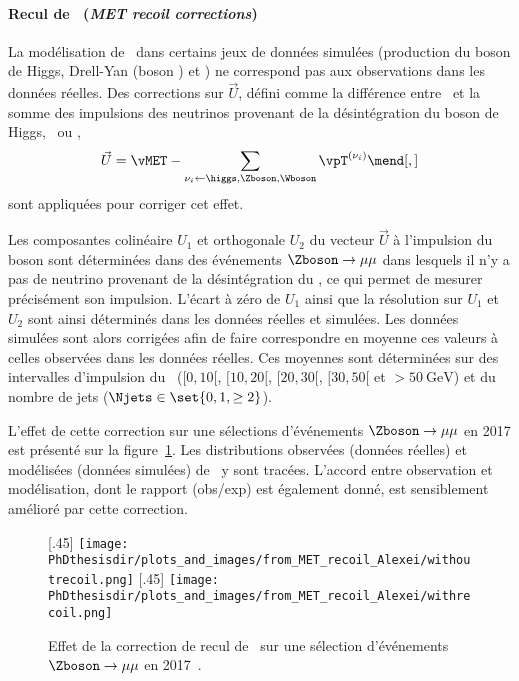 \paragraph{Recul de \MET\ (\emph{MET recoil corrections})}
La modélisation de \MET\ dans certains jeux de données simulées (production du boson de Higgs, Drell-Yan (boson \Zboson) et \Wjets) ne correspond pas aux observations dans les données réelles.
Des corrections sur $\vec{U}$, défini comme la différence entre \MET\ et la somme des impulsions des neutrinos provenant de la désintégration du boson de Higgs, \Zboson\ ou \Wboson, \ie
\begin{equation}
\vec{U} = \vMET - \sum_{\nu_i \leftarrow \higgs,\Zboson,\Wboson} \vpT^{(\nu_i)}
\mend[,]
\end{equation}
sont appliquées pour corriger cet effet.
\par
Les composantes colinéaire $U_1$ et orthogonale $U_2$ du vecteur $\vec{U}$ à l'impulsion du boson sont déterminées dans des événements $\Zboson\to\mu\mu$ dans lesquels il n'y a pas de neutrino provenant de la désintégration du \Zboson, ce qui permet de mesurer précisément son impulsion.
L'écart à zéro de $U_1$ ainsi que la résolution sur $U_1$ et $U_2$ sont ainsi déterminés dans les données réelles et simulées.
Les données simulées sont alors corrigées afin de faire correspondre en moyenne ces valeurs à celles observées dans les données réelles.
Ces moyennes sont déterminées sur des intervalles d'impulsion du \Zboson\ ($[\num{0}, \num{10}[$, $[\num{10}, \num{20}[$, $[\num{20}, \num{30}[$, $[\num{30}, \num{50}[$ et $>\SI{50}{\GeV}$) et du nombre de jets ($\Njets\in\set{0, 1, \geq2}$).
\par
L'effet de cette correction sur une sélections d'événements $\Zboson\to\mu\mu$ en 2017 est présenté sur la figure~\ref{fig-MET_recoil_Alexei}.
Les distributions observées (données réelles) et modélisées (données simulées) de \MET\ y sont tracées.
L'accord entre observation et modélisation, dont le rapport (obs/exp) est également donné, est sensiblement amélioré par cette correction.
\begin{figure}[h]
\centering

[.45\textwidth]
{\texttt{[image: \\PhDthesisdir/plots\_and\_images/from\_MET\_recoil\_Alexei/withoutrecoil.png]}}
\hfill
{}[.45\textwidth]
{\texttt{[image: \\PhDthesisdir/plots\_and\_images/from\_MET\_recoil\_Alexei/withrecoil.png]}}

\caption[Effet de la correction de recul de \MET.]{Effet de la correction de recul de \MET\ sur une sélection d'événements $\Zboson\to\mu\mu$ en 2017~\cite{MET_recoil_Alexei}.}
\label{fig-MET_recoil_Alexei}
\end{figure}